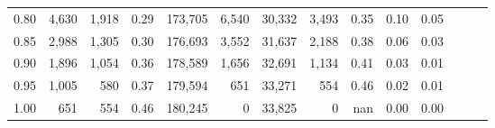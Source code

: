 \begin{tabular}{rrrrrrrrrrrrrr}
0.80 &   4,630 &  1,918 &  0.29 &  173,705 &    6,540 &  30,332 &   3,493 &  0.35 &  0.10 &      0.05 \\
0.85 &   2,988 &  1,305 &  0.30 &  176,693 &    3,552 &  31,637 &   2,188 &  0.38 &  0.06 &      0.03 \\
0.90 &   1,896 &  1,054 &  0.36 &  178,589 &    1,656 &  32,691 &   1,134 &  0.41 &  0.03 &      0.01 \\
0.95 &   1,005 &    580 &  0.37 &  179,594 &      651 &  33,271 &     554 &  0.46 &  0.02 &      0.01 \\
1.00 &     651 &    554 &  0.46 &  180,245 &        0 &  33,825 &       0 &   nan &  0.00 &      0.00 \\
\bottomrule
\end{tabular}
